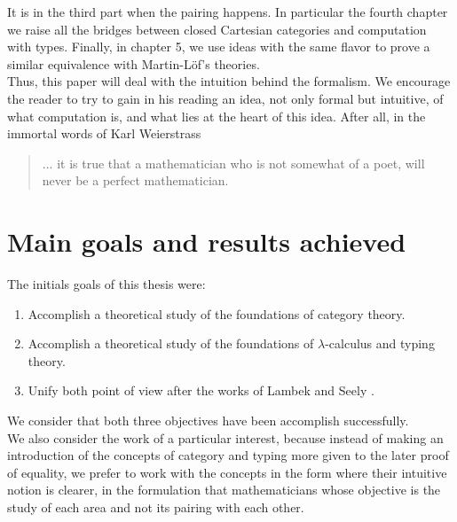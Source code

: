 It is in the third part when the pairing happens. In particular the fourth chapter we raise all the bridges between closed Cartesian categories and computation with types. Finally, in chapter 5, we use ideas with the same flavor to prove a similar equivalence with Martin-L\"of's theories. \\

Thus, this paper will deal with the intuition behind the formalism. We encourage the reader to try to gain in his reading an idea, not only formal but intuitive, of what computation is, and what lies at the heart of this idea.  After all, in the immortal words of Karl Weierstrass \cite{duporcq1902compte}

\begin{quote}
... it is true that a mathematician who is not somewhat of a poet, will never be a perfect mathematician.\\
\end{quote}

\section*{Main goals and results achieved}
The initials goals of this thesis were:
\begin{enumerate}
\item Accomplish a theoretical study of the foundations of category theory.
\item Accomplish a theoretical study of the foundations of $\lambda$-calculus and typing theory.
\item Unify both point of view after the works of Lambek \cite{lambek1988introduction} and Seely \cite{seely1984locally}.
\end{enumerate}

We consider that both three objectives have been accomplish successfully.\\

We also consider the work of a particular interest, because instead of making an introduction of the concepts of category and typing more given to the later proof of equality, we prefer to work with the concepts in the form where their intuitive notion is clearer, in the formulation that mathematicians whose objective is the study of each area and not its pairing with each other.



\endinput
